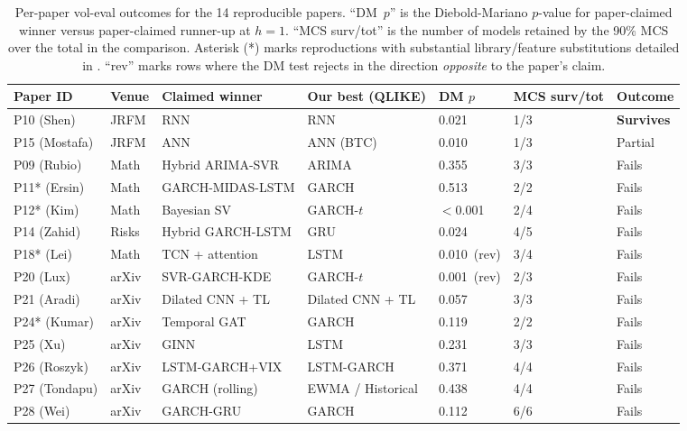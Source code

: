 \begin{table}[H]
\centering
\caption{Per-paper vol-eval outcomes for the 14 reproducible papers. ``DM~$p$'' is the Diebold-Mariano $p$-value for paper-claimed winner versus paper-claimed runner-up at $h=1$. ``MCS surv/tot'' is the number of models retained by the 90\% MCS over the total in the comparison. Asterisk (*) marks reproductions with substantial library/feature substitutions detailed in . ``rev'' marks rows where the DM test rejects in the direction \emph{opposite} to the paper's claim.}\label{tab:phase2_appendix}
\scriptsize
\setlength{\tabcolsep}{4pt}
\begin{tabular}{p{2.0cm}p{0.8cm}p{3.3cm}p{2.9cm}p{1.5cm}p{1.2cm}p{1.5cm}}
\toprule
Paper ID & Venue & Claimed winner & Our best (QLIKE) & DM $p$ & MCS surv/tot & Outcome \\
\midrule
P10 (Shen)        & JRFM  & RNN                & RNN                  & 0.021         & 1/3 & \textbf{Survives} \\
P15 (Mostafa)     & JRFM  & ANN                & ANN (BTC)            & 0.010         & 1/3 & Partial \\
\midrule
P09 (Rubio)       & Math  & Hybrid ARIMA-SVR   & ARIMA                & 0.355         & 3/3 & Fails \\
P11* (Ersin)      & Math  & GARCH-MIDAS-LSTM   & GARCH                & 0.513         & 2/2 & Fails \\
P12* (Kim)        & Math  & Bayesian SV        & GARCH-$t$            & $<$0.001      & 2/4 & Fails \\
P14 (Zahid)       & Risks & Hybrid GARCH-LSTM  & GRU                  & 0.024         & 4/5 & Fails \\
P18* (Lei)        & Math  & TCN + attention    & LSTM                 & 0.010~(rev)   & 3/4 & Fails \\
P20 (Lux)         & arXiv & SVR-GARCH-KDE      & GARCH-$t$            & 0.001~(rev)   & 2/3 & Fails \\
P21 (Aradi)       & arXiv & Dilated CNN + TL   & Dilated CNN + TL     & 0.057         & 3/3 & Fails \\
P24* (Kumar)      & arXiv & Temporal GAT       & GARCH                & 0.119         & 2/2 & Fails \\
P25 (Xu)          & arXiv & GINN               & LSTM                 & 0.231         & 3/3 & Fails \\
P26 (Roszyk)      & arXiv & LSTM-GARCH+VIX     & LSTM-GARCH           & 0.371         & 4/4 & Fails \\
P27 (Tondapu)     & arXiv & GARCH (rolling)    & EWMA / Historical    & 0.438         & 4/4 & Fails \\
P28 (Wei)         & arXiv & GARCH-GRU          & GARCH                & 0.112         & 6/6 & Fails \\
\bottomrule
\end{tabular}
\end{table}

